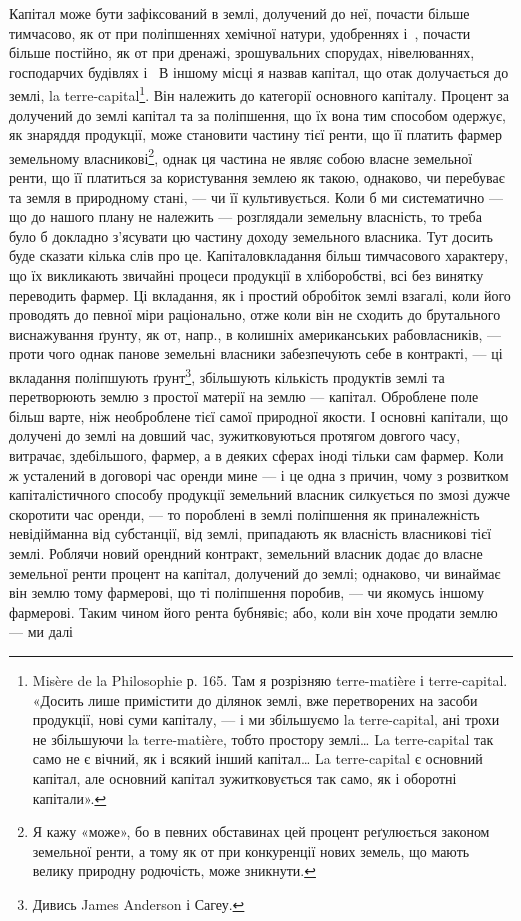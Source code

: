 Капітал може бути зафіксований в землі, долучений до неї, почасти
більше тимчасово, як от при поліпшеннях хемічної натури, удобреннях і~,
почасти більше постійно, як от при дренажі, зрошувальних спорудах, нівелюваннях,
господарчих будівлях і~ В іншому місці я назвав капітал, що
отак долучається до землі, la terre-capital\footnote{
Misère de la Philosophie р. 165. Там я розрізняю terre-matière і terre-capital. «Досить лише
примістити до ділянок землі, вже перетворених на засоби продукції, нові суми капіталу, — і ми
збільшуємо la terre-capital, ані трохи не збільшуючи la terre-matière, тобто простору землі\dots{} La
terre-capital так само не є вічний, як і всякий інший капітал\dots{} La terre-capital є основний
капітал, але основний капітал зужитковується так само, як і оборотні капітали».
}. Він належить до категорії основного
капіталу. Процент за долучений до землі капітал та за поліпшення, що їх вона
тим способом одержує, як знаряддя продукції, може становити частину тієї
ренти, що її платить фармер земельному власникові\footnote{
Я кажу «може», бо в певних обставинах цей процент реґулюється законом земельної ренти, а тому як
от при конкуренції нових земель, що мають велику природну родючість, може зникнути.
}, однак ця частина не
являє собою власне земельної ренти, що її платиться за користування землею
як такою, однаково, чи перебуває та земля в природному стані, — чи її культивується.
Коли б ми систематично — що до нашого плану не належить — розглядали
земельну власність, то треба було б докладно з’ясувати цю частину
доходу земельного власника. Тут досить буде сказати кілька слів про це.
Капіталовкладання більш тимчасового характеру, що їх викликають звичайні
процеси продукції в хліборобстві, всі без винятку переводить фармер. Ці вкладання,
як і простий обробіток землі взагалі, коли його проводять до певної
міри раціонально, отже коли він не сходить до брутального виснажування
ґрунту, як от, напр., в колишніх американських рабовласників, — проти чого
однак панове земельні власники забезпечують себе в контракті, — ці вкладання
поліпшують ґрунт\footnote{
Дивись James Anderson і Сагеу.
}, збільшують кількість продуктів землі та перетворюють
землю з простої матерії на землю — капітал. Оброблене поле більш варте, ніж
необроблене тієї самої природної якости. І основні капітали, що долучені до
землі на довший час, зужитковуються протягом довгого часу, витрачає, здебільшого,
фармер, а в деяких сферах іноді тільки сам фармер. Коли ж усталений в
договорі час оренди мине — і це одна з причин, чому з розвитком капіталістичного
способу продукції земельний власник силкується по змозі дужче скоротити
час оренди, — то пороблені в землі поліпшення як приналежність невідійманна
від субстанції, від землі, припадають як власність власникові тієї землі.
Роблячи новий орендний контракт, земельний власник додає до власне земельної
ренти процент на капітал, долучений до землі; однаково, чи винаймає він землю
тому фармерові, що ті поліпшення поробив, — чи якомусь іншому фармерові.
Таким чином його рента бубнявіє; або, коли він хоче продати землю — ми далі
\parbreak{}  %
